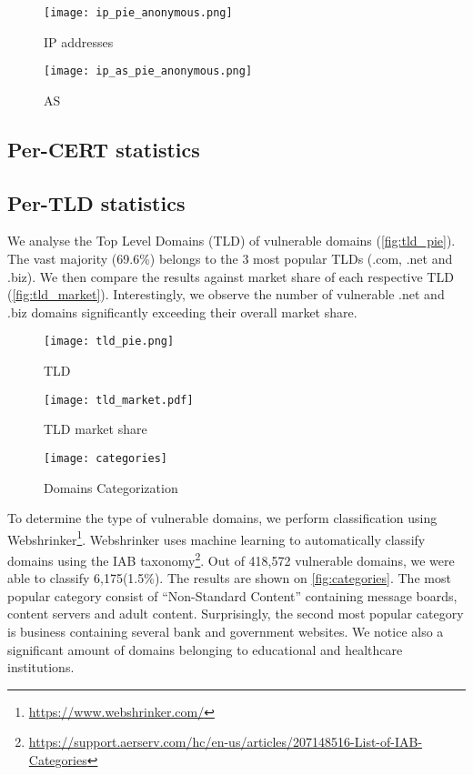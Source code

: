 \begin{figure}[!hbt]
\centering
\texttt{[image: ip\_pie\_anonymous.png]}
\caption{IP addresses}
\label{fig:ip_pie}
\end{figure}

\begin{figure}[!hbt]
\centering
\texttt{[image: ip\_as\_pie\_anonymous.png]}
\caption{AS}
\label{fig:ip_as_pie}
\end{figure}

\subsection{Per-CERT statistics}
\subsection{Per-TLD statistics}

We analyse the Top Level Domains (TLD) of vulnerable domains (\autoref{fig:tld_pie}). The vast majority (69.6\%) belongs to the 3 most popular TLDs (.com, .net and .biz). We then compare the results against market share of each respective TLD (\autoref{fig:tld_market}). Interestingly, we observe the number of vulnerable .net and .biz domains significantly exceeding their overall market share. 

\begin{figure}[!hbt]
\centering
\texttt{[image: tld\_pie.png]}
\caption{TLD}
\label{fig:tld_pie}
\end{figure}

\begin{figure}[!hbt]
\centering
\texttt{[image: tld\_market.pdf]}
\caption{TLD market share}
\label{fig:tld_market}
\end{figure}



\begin{figure}[!hbt]
\centering
\texttt{[image: categories]}
\caption{Domains Categorization}
\label{fig:categories}
\end{figure}

To determine the type of vulnerable domains, we perform classification using Webshrinker\footnote{\url{https://www.webshrinker.com/}}. Webshrinker uses machine learning to automatically classify domains using the IAB taxonomy\footnote{\url{https://support.aerserv.com/hc/en-us/articles/207148516-List-of-IAB-Categories}}. Out of 418,572 vulnerable domains, we were able to classify 6,175(1.5\%). 
The results are shown on \autoref{fig:categories}. The most popular category consist of ``Non-Standard Content'' containing message boards, content servers and adult content. Surprisingly, the second most popular category is business containing several bank and government websites. We notice also a significant amount of domains belonging to educational and healthcare institutions. 

